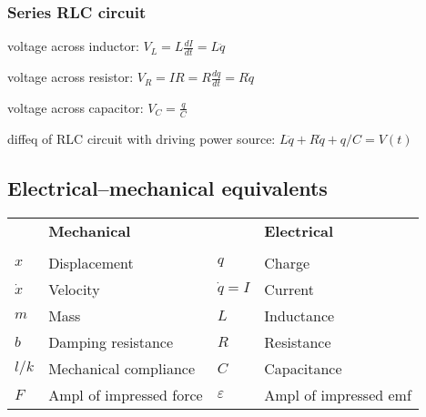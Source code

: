 \documentclass[letterpaper,landscape,10pt]{article}
\newenvironment{mydescription}
{\begin{description}
	\setlength{\itemsep}{0pt}
	\setlength{\parskip}{0pt}
	\setlength{\parsep}{-1pt}}
{\end{description}}
\begin{document}
{\begin{multicols}{3}
	
	\subsubsection*{Series RLC circuit}
		\begin{mydescription}
			\item[voltage across inductor:]
				$V_L = L \frac{dI}{dt} = L\ddot{q}$  \\
			\item[voltage across resistor:]
				$V_R = IR = R\frac{dq}{dt} = R\dot{q}$  \\
			\item[voltage across capacitor:]
				$V_C = \frac{q}{C}$  \\
			\item[diffeq of RLC circuit with driving power source:]
				$L\ddot{q} + R\dot{q} + q/C = V(t)$  \\
		\end{mydescription}

	\subsection*{Electrical--mechanical equivalents}
		\begin{tabular}{l l l l}
			& \textbf{Mechanical} & & \textbf{Electrical} \\[3pt]
			\\[3pt]
			$x$       & Displacement            & $q$           & Charge \\
			[3pt]
			$\dot{x}$ & Velocity                & $\dot{q}=I$   & Current \\
			[3pt]
			$m$		  & Mass                    & $L$           & Inductance \\
			[3pt]
			$b$		  & Damping resistance 		& $R$			& Resistance \\
			[3pt]
			$l/k$	  & Mechanical compliance 	& $C$			& Capacitance \\
			[3pt]
			$F$		  & Ampl of impressed force & $\varepsilon$ &
												Ampl of impressed emf
		\end{tabular}
\end{multicols}
}
\end{document}
